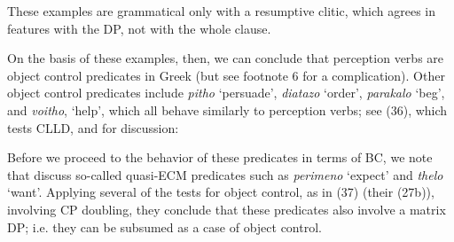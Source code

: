 \documentclass[output=paper]{langsci/langscibook}
\begin{document}
\ea%
    \label{ex:alexiadou:40}
    \z
\z  

These examples are grammatical only with a resumptive clitic, which agrees in features with the DP, not with the whole clause.{} 

On the basis of these examples, then, we can conclude that perception verbs are object control predicates in Greek (but see footnote 6 for a complication). Other object control predicates include \textit{pitho} ‘persuade’, \textit{diatazo} ‘order’, \textit{parakalo} ‘beg’, and \textit{voitho}, ‘help’, which all behave similarly to perception verbs; see (36), which tests CLLD, and \citet{Kotzoglou2002} for discussion:

    \z

Before we proceed to the behavior of these predicates in terms of BC, we note that \citet{Kotzoglou2007} discuss so-called quasi-ECM predicates such as \textit{perimeno} ‘expect’ and \textit{thelo} ‘want’. Applying several of the tests for object control, as in (37) (their (27b)), involving CP doubling, they conclude that these predicates also involve a matrix DP; i.e. they can be subsumed as a case of object control. 
\end{document}
